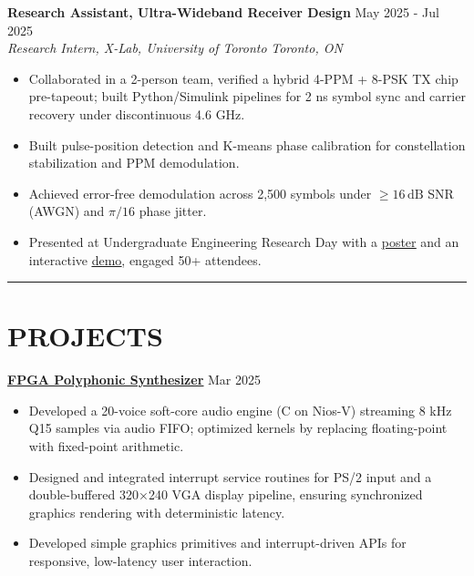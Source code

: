\documentclass[letterpaper,10pt]{article}
\begin{document}
\vspace{0.3em}
\noindent\textbf{Research Assistant, Ultra-Wideband Receiver Design} \hfill May 2025 - Jul 2025\\
\textit{Research Intern, X-Lab, University of Toronto} \hfill \textit{Toronto, ON}
\begin{itemize}[leftmargin=0.2in]
    \item Collaborated in a 2-person team, verified a hybrid 4-PPM + 8-PSK TX chip pre-tapeout; built Python/Simulink pipelines for 2 ns symbol sync and carrier recovery under discontinuous 4.6 GHz.
	\item Built pulse-position detection and K-means phase calibration for constellation stabilization and PPM demodulation.
    \item Achieved error-free demodulation across 2,500 symbols under $\geq 16\,\mathrm{dB}$ SNR (AWGN) and $\pi/16$ phase jitter.
    \item Presented at Undergraduate Engineering Research Day with a \href{https://docs.google.com/presentation/d/1h4lmc_HQLzNvtGE4oE1jedOlNVZjL3iztEyGKnC-ico/edit?usp=sharing}{\uline{poster}} and an interactive \href{https://github.com/Ken-2511/ppm-psk-visualize}{\uline{demo}}, engaged 50+ attendees.
\end{itemize}

\noindent\rule{\linewidth}{1pt}

\section*{\textbf{PROJECTS}}
\noindent\href{https://github.com/alexzjm/ece243-sound-synthesizer}{\uline{
    \textbf{FPGA Polyphonic Synthesizer}}} \hfill Mar 2025
\begin{itemize}[leftmargin=0.2in]
  \item Developed a 20-voice soft-core audio engine (C on Nios-V) streaming 8 kHz Q15 samples via audio FIFO; optimized kernels by replacing floating-point with fixed-point arithmetic.
  \item Designed and integrated interrupt service routines for PS/2 input and a double-buffered 320×240 VGA display pipeline, ensuring synchronized graphics rendering with deterministic latency.
  \item Developed simple graphics primitives and interrupt-driven APIs for responsive, low-latency user interaction.
\end{itemize}
\end{document}
